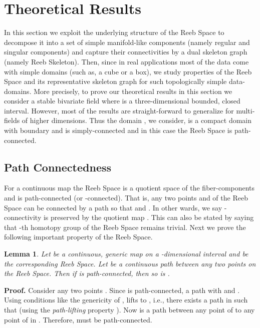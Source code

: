 \documentclass[twocolumn]{article}
\newtheorem{lemma}[theorem]{Lemma}
\renewenvironment{proof}{{\bf Proof. }}{\hspace*{\fill}\bigskip\noindent}
\begin{document}
 \section{Theoretical Results}
\label{sec:Theory}
In this section we exploit the underlying structure of the Reeb Space
to decompose it into a set of simple manifold-like components (namely
regular and singular components) and capture 
their connectivities by a dual skeleton graph (namely Reeb Skeleton).
Then, since in real applications most of the data come with simple
domains (such as, a cube or a box), we study properties of the Reeb Space and its representative skeleton graph
for such topologically simple data-domains. More precisely, to prove our 
theoretical results in this section we consider a stable bivariate
field  where  is a
three-dimensional bounded, closed interval. 
However, most of the results
are straight-forward to generalize for multi-fields of  
higher dimensions. Thus the domain , we consider, is a compact domain with
boundary and is simply-connected and in this case 
the Reeb Space is path-connected.

\subsection{Path Connectedness}
For a continuous map  the Reeb Space is a quotient space of the
fiber-components and is path-connected (or -connected). That is, any two points  and  of the
Reeb Space can be connected by a path 
so that  and . In other wards, we say -connectivity is
preserved by the quotient map . This can also be stated by
saying that -th homotopy group of the Reeb Space  remains trivial.
Next we prove the following important property of the Reeb Space.

\begin{lemma}
\label{lem:path}
Let  be a continuous, generic map on a -dimensional interval   and
 be the corresponding Reeb Space. Let  be a
continuous path between any two points on the Reeb Space. Then
if  is path-connected, then so
is .
\end{lemma}
\noindent
\begin{proof}
Consider any two points . Since  is path-connected,  a path
 with  and
.  Using conditions like
the genericity of ,  lifts to ,
i.e., there exists a path  in
 such that  (using the
\emph{path-lifting} property \cite{2002-Hatcher}).
Now  is a path between any point of  to any point
of  in . Therefore,  must be path-connected.
\end{proof}
\end{document}
